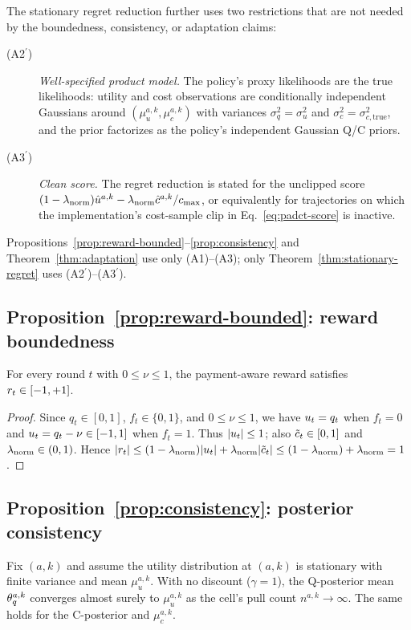 The stationary regret reduction further uses two restrictions that are not
needed by the boundedness, consistency, or adaptation claims:
\begin{description}
\item[(A2$^\prime$)] \emph{Well-specified product model.} The policy's
proxy likelihoods are the true likelihoods: utility and cost observations are
conditionally independent Gaussians around $(\mu_u^{a,k},\mu_c^{a,k})$ with
variances $\sigma_q^2=\sigma_u^2$ and
$\sigma_c^2=\sigma_{c,\mathrm{true}}^2$, and the prior factorizes as the
policy's independent Gaussian Q/C priors.
\item[(A3$^\prime$)] \emph{Clean score.} The regret reduction is stated for the
unclipped score
$(1-\lambda_{\mathrm{norm}})\hat u^{a,k}-\lambda_{\mathrm{norm}}\hat c^{a,k}/c_{\max}$, or equivalently for
trajectories on which the implementation's cost-sample clip in
Eq.~\eqref{eq:padct-score} is inactive.
\end{description}
Propositions~\ref{prop:reward-bounded}--\ref{prop:consistency} and
Theorem~\ref{thm:adaptation} use only (A1)--(A3); only
Theorem~\ref{thm:stationary-regret} uses (A2$^\prime$)--(A3$^\prime$).

\subsection{Proposition~\ref{prop:reward-bounded}: reward boundedness}
\label{app:proof-bounded}

\begin{proposition}
\label{prop:reward-bounded}
For every round $t$ with $0\le\nu\le1$, the payment-aware reward satisfies
$r_t\in[-1,+1]$.
\end{proposition}

\begin{proof}
Since $q_t\in[0,1]$, $f_t\in\{0,1\}$, and $0\le\nu\le1$, we have
$u_t=q_t$ when $f_t=0$ and $u_t=q_t-\nu\in[-1,1]$ when $f_t=1$.
Thus $|u_t|\leq1$; also $\tilde c_t\in[0,1]$ and
$\lambda_{\mathrm{norm}}\in(0,1)$. Hence
$|r_t|\leq(1-\lambda_{\mathrm{norm}})|u_t|+\lambda_{\mathrm{norm}}|\tilde c_t|\leq(1-\lambda_{\mathrm{norm}})+\lambda_{\mathrm{norm}}=1$.
\end{proof}

\subsection{Proposition~\ref{prop:consistency}: posterior consistency}
\label{app:proof-consistency}

\begin{proposition}
\label{prop:consistency}
Fix $(a,k)$ and assume the utility distribution at $(a,k)$ is stationary with
finite variance and mean $\mu_u^{a,k}$. With no discount ($\gamma=1$), the
Q-posterior mean $\theta_q^{a,k}$ converges almost surely to $\mu_u^{a,k}$ as the
cell's pull count $n^{a,k}\to\infty$. The same holds for the C-posterior and
$\mu_c^{a,k}$.
\end{proposition}

